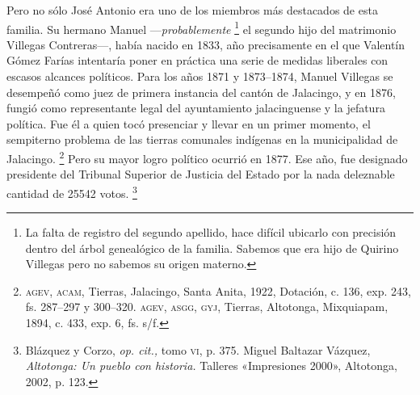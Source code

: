 \documentclass[14pt,twoside,final]{extbook} %
\let\oldfootnote\footnote
\renewcommand\footnote[1]{%
\oldfootnote{\hspace{1mm}#1}}
\begin{document}
Pero no sólo José Antonio era uno de los miembros más destacados de esta familia. Su hermano Manuel ---\emph{probablemente}\footnote{La falta de registro del segundo apellido, hace difícil ubicarlo con precisión dentro del árbol genealógico de la familia. Sabemos que era hijo de Quirino Villegas\index[nombres]{Villegas, Quirino} pero no sabemos su origen materno.} el segundo hijo del matrimonio Villegas Contreras---, había nacido en 1833, año precisamente en el que Valentín Gómez Farías intentaría poner en práctica una serie de medidas liberales con escasos alcances políticos. Para los años 1871 y 1873--1874, Manuel Villegas se desempeñó como juez de primera instancia del cantón de Jalacingo, y en 1876, fungió como representante legal del ayuntamiento jalacinguense y la jefatura política. Fue él a quien tocó presenciar y llevar en un primer momento, el sempiterno problema de las tierras comunales indígenas en la municipalidad de Jalacingo.\footnote{\textsc{agev, acam}, Tierras, Jalacingo, Santa Anita, 1922, Dotación, c. 136, exp. 243, fs. 287--297 y 300--320. \textsc{agev, asgg, gyj}, Tierras, Altotonga, Mixquiapam, 1894, c. 433, exp. 6, fs. s/f.} Pero su mayor logro político ocurrió en 1877. Ese año, fue designado presidente del Tribunal Superior de Justicia del Estado por la nada deleznable cantidad de 25542 votos.\footnote{Blázquez y Corzo, \emph{op. cit.,} tomo \textsc{vi}, p. 375. Miguel Baltazar Vázquez, \emph{Altotonga: Un pueblo con historia.} Talleres «Impresiones 2000», Altotonga, 2002, p. 123.}
\end{document}
